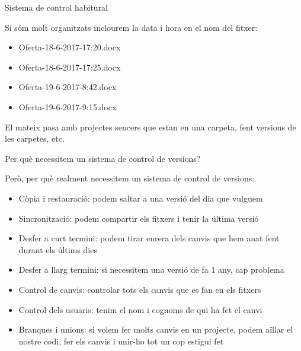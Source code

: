 \documentclass[10pt,xcolor={rgb}]{beamer}
\begin{document}
    \begin{frame}[fragile]{Sistema de control habitural}
      
      \begin{block}{Si sóm molt organitzats inclourem la data i hora en el nom del fitxer:}
            
            \begin{itemize}
              \item Oferta-18-6-2017-17:20.docx
              \item Oferta-18-6-2017-17:25.docx
              \item Oferta-19-6-2017-8:42.docx
              \item Oferta-19-6-2017-9:15.docx
            \end{itemize}

      \end{block}
      El mateix pasa amb projectes sencers que estan en una carpeta, fent versions de les carpetes, etc.
    \end{frame}
          
    \begin{frame}[fragile]{Per què necessitem un sistema de control de versions?}
      
      \begin{block}{Però, per què realment necessitem un sistema de control de versions:}
            
            \begin{itemize}
              \item Còpia i restauració:  podem saltar a una versió del dia que vulguem
              \item Sincronització: podem compartir els fitxers i tenir la última versió
              \item Desfer a curt termini:  podem tirar enrera dels canvis que hem anat fent durant els últims dies
              \item Desfer a llarg termini:  si necessitem una versió de fa 1 any, cap problema
              \item Control de canvis:  controlar tots els canvis que es fan en els fitxers 
              \item Control dels usuaris:  tenim el nom i cognoms de qui ha fet el canvi
              \item Branques i unions:  si volem fer molts canvis en un projecte, podem aïllar el nostre codi, fer els canvis i unir-ho tot un cop estigui fet
            \end{itemize}

      \end{block}

    \end{frame}
\end{document}
